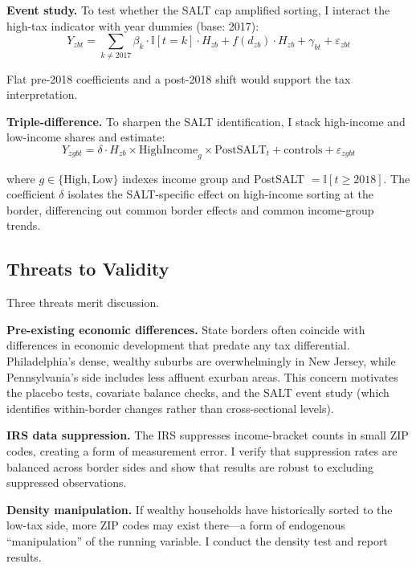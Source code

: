 \documentclass[12pt]{article}
\newcommand{\ind}{\mathbb{I}}
\begin{document}
\textbf{Event study.} To test whether the SALT cap amplified sorting, I interact the high-tax indicator with year dummies (base: 2017):
\begin{equation}
Y_{zbt} = \sum_{k \neq 2017} \beta_k \cdot \ind[t=k] \cdot H_{zb} + f(d_{zb}) \cdot H_{zb} + \gamma_{bt} + \varepsilon_{zbt}
\end{equation}

Flat pre-2018 coefficients and a post-2018 shift would support the tax interpretation.

\textbf{Triple-difference.} To sharpen the SALT identification, I stack high-income and low-income shares and estimate:
\begin{equation}
Y_{zgbt} = \delta \cdot H_{zb} \times \text{HighIncome}_g \times \text{PostSALT}_t + \text{controls} + \varepsilon_{zgbt}
\end{equation}

\noindent where $g \in \{\text{High}, \text{Low}\}$ indexes income group and PostSALT $= \ind[t \geq 2018]$. The coefficient $\delta$ isolates the SALT-specific effect on high-income sorting at the border, differencing out common border effects and common income-group trends.

\subsection{Threats to Validity}

Three threats merit discussion.

\textbf{Pre-existing economic differences.} State borders often coincide with differences in economic development that predate any tax differential. Philadelphia's dense, wealthy suburbs are overwhelmingly in New Jersey, while Pennsylvania's side includes less affluent exurban areas. This concern motivates the placebo tests, covariate balance checks, and the SALT event study (which identifies within-border changes rather than cross-sectional levels).

\textbf{IRS data suppression.} The IRS suppresses income-bracket counts in small ZIP codes, creating a form of measurement error. I verify that suppression rates are balanced across border sides and show that results are robust to excluding suppressed observations.

\textbf{Density manipulation.} If wealthy households have historically sorted to the low-tax side, more ZIP codes may exist there---a form of endogenous ``manipulation'' of the running variable. I conduct the \citet{mccrary2008manipulation} density test and report results.
\end{document}
